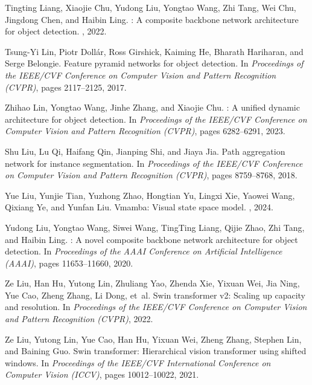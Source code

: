 \documentclass[10pt,twocolumn,letterpaper]{article}
\begin{document}
{\begin{thebibliography}{10}
		Tingting Liang, Xiaojie Chu, Yudong Liu, Yongtao Wang, Zhi Tang, Wei Chu,
		Jingdong Chen, and Haibin Ling.
		: A composite backbone network architecture for object
		detection.
		, 2022.
		
		Tsung-Yi Lin, Piotr Doll{\'a}r, Ross Girshick, Kaiming He, Bharath Hariharan,
		and Serge Belongie.
		\newblock Feature pyramid networks for object detection.
		\newblock In {\em Proceedings of the IEEE/CVF Conference on Computer Vision and
			Pattern Recognition (CVPR)}, pages 2117--2125, 2017.
		
		Zhihao Lin, Yongtao Wang, Jinhe Zhang, and Xiaojie Chu.
		: A unified dynamic architecture for object detection.
		\newblock In {\em Proceedings of the IEEE/CVF Conference on Computer Vision and
			Pattern Recognition (CVPR)}, pages 6282--6291, 2023.
		
		Shu Liu, Lu Qi, Haifang Qin, Jianping Shi, and Jiaya Jia.
		\newblock Path aggregation network for instance segmentation.
		\newblock In {\em Proceedings of the IEEE/CVF Conference on Computer Vision and
			Pattern Recognition (CVPR)}, pages 8759--8768, 2018.
		
		Yue Liu, Yunjie Tian, Yuzhong Zhao, Hongtian Yu, Lingxi Xie, Yaowei Wang,
		Qixiang Ye, and Yunfan Liu.
		\newblock Vmamba: Visual state space model.
		, 2024.
		
		Yudong Liu, Yongtao Wang, Siwei Wang, TingTing Liang, Qijie Zhao, Zhi Tang, and
		Haibin Ling.
		: A novel composite backbone network architecture for object
		detection.
		\newblock In {\em Proceedings of the AAAI Conference on Artificial Intelligence
			(AAAI)}, pages 11653--11660, 2020.
		
		Ze Liu, Han Hu, Yutong Lin, Zhuliang Yao, Zhenda Xie, Yixuan Wei, Jia Ning, Yue
		Cao, Zheng Zhang, Li Dong, et~al.
		\newblock Swin transformer v2: Scaling up capacity and resolution.
		\newblock In {\em Proceedings of the IEEE/CVF Conference on Computer Vision and
			Pattern Recognition (CVPR)}, 2022.
		
		Ze Liu, Yutong Lin, Yue Cao, Han Hu, Yixuan Wei, Zheng Zhang, Stephen Lin, and
		Baining Guo.
		\newblock Swin transformer: Hierarchical vision transformer using shifted
		windows.
		\newblock In {\em Proceedings of the IEEE/CVF International Conference on
			Computer Vision (ICCV)}, pages 10012--10022, 2021.
		

\end{thebibliography}}
\end{document}
